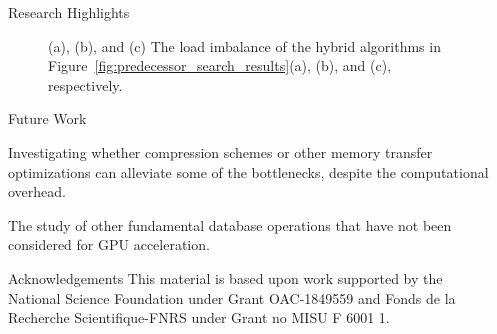 \documentclass[final]{beamer}
\newlength{\sepwidth}
\newlength{\colwidth}
\newcommand{\separatorcolumn}{\begin{column}{\sepwidth}\end{column}}
\begin{document}
\begin{frame}[t]
\begin{columns}[t]
\begin{column}{\colwidth}
\begin{block}{Research Highlights}
\begin{figure}[htp]
\centering
{}
\caption{(a), (b), and (c) The load imbalance of the hybrid algorithms in Figure~\ref{fig:predecessor_search_results}(a), (b), and (c), respectively. }
\label{fig:multiway_merge_results}
\end{figure}

\end{block} 

\begin{block}{Future Work}

\begin{description}[font=$\bullet$~\normalfont\scshape\color{red!50!black}]
\item Investigating whether compression schemes or other memory transfer optimizations can alleviate some of the bottlenecks, despite the computational overhead.
\item The study of other fundamental database operations that have not been considered for GPU acceleration.
\end{description}

\end{block}

\begin{block}{Acknowledgements}
This material is based upon work supported by the National Science Foundation under Grant OAC-1849559 and Fonds de la Recherche Scientifique-FNRS under Grant no MISU F 6001 1.
\end{block}

\end{column}

\separatorcolumn
\end{columns}
\end{frame}
\end{document}
